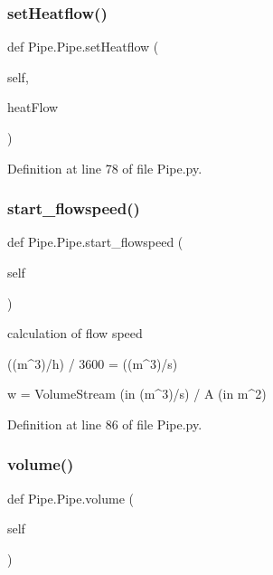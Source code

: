 \subsubsection{\texorpdfstring{set\+Heatflow()}{setHeatflow()}}
{\footnotesize\ttfamily def Pipe.\+Pipe.\+set\+Heatflow (\begin{DoxyParamCaption}\item[{}]{self,  }\item[{}]{heat\+Flow }\end{DoxyParamCaption})}



Definition at line 78 of file Pipe.\+py.

\mbox{\label{class_pipe_1_1_pipe_a184f926c3aee89e94c19b003d6cc9416}} 
\subsubsection{\texorpdfstring{start\+\_\+flowspeed()}{start\_flowspeed()}}
{\footnotesize\ttfamily def Pipe.\+Pipe.\+start\+\_\+flowspeed (\begin{DoxyParamCaption}\item[{}]{self }\end{DoxyParamCaption})}

\begin{DoxyVerb}calculation of flow speed

((m^3)/h) / 3600 = ((m^3)/s)

w = VolumeStream (in (m^3)/s) / A (in m^2)
\end{DoxyVerb}
 

Definition at line 86 of file Pipe.\+py.

\mbox{\label{class_pipe_1_1_pipe_a2fdfff20143b09a5c32f335bf55edebc}} 
\subsubsection{\texorpdfstring{volume()}{volume()}}
{\footnotesize\ttfamily def Pipe.\+Pipe.\+volume (\begin{DoxyParamCaption}\item[{}]{self }\end{DoxyParamCaption})}



